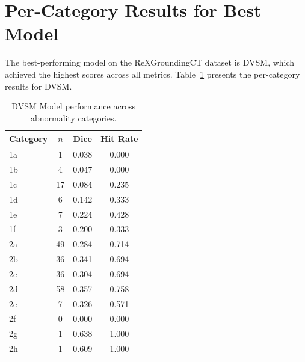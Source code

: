 \section{Per-Category Results for Best Model}

The best-performing model on the ReXGroundingCT dataset is DVSM, which achieved the highest scores across all metrics.
Table~\ref{tab:category-performance} presents the per-category results for DVSM.

\begin{table}[ht]
\centering
\caption{DVSM Model performance across abnormality categories.}
\label{tab:category-performance}
\begin{tabular}{lccc}
\toprule
\textbf{Category} & \textbf{$n$} & \textbf{Dice} & \textbf{Hit Rate} \\
\midrule
1a & 1  & 0.038 & 0.000 \\
1b & 4  & 0.047 & 0.000 \\
1c & 17 & 0.084 & 0.235 \\
1d & 6  & 0.142 & 0.333 \\
1e & 7  & 0.224 & 0.428 \\
1f & 3  & 0.200 & 0.333 \\
2a & 49 & 0.284 & 0.714 \\
2b & 36 & 0.341 & 0.694 \\
2c & 36 & 0.304 & 0.694 \\
2d & 58 & 0.357 & 0.758 \\
2e & 7  & 0.326 & 0.571 \\
2f & 0  & 0.000 & 0.000 \\
2g & 1  & 0.638 & 1.000 \\
2h & 1  & 0.609 & 1.000 \\
\bottomrule
\end{tabular}
\end{table}


